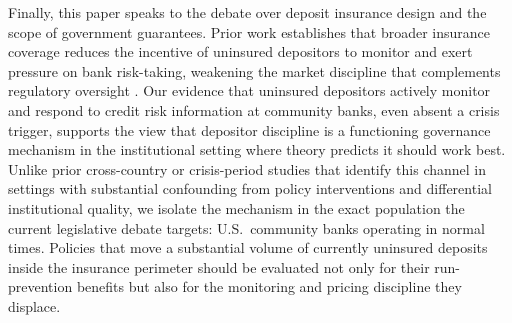 Finally, this paper speaks to the debate over deposit insurance design and the
scope of government guarantees.  Prior work establishes that broader insurance
coverage reduces the incentive of uninsured depositors to monitor and exert
pressure on bank risk-taking, weakening the market discipline that complements
regulatory oversight \citep{demirgucc2004market, flannery2019market}.  Our
evidence that uninsured depositors actively monitor and respond to credit risk
information at community banks, even absent a crisis trigger, supports the view
that depositor discipline is a functioning governance mechanism in the
institutional setting where theory predicts it should work best.  Unlike prior
cross-country or crisis-period studies that identify this channel in settings
with substantial confounding from policy interventions and differential
institutional quality, we isolate the mechanism in the exact population the
current legislative debate targets: U.S.\ community banks operating in normal
times.  Policies that move a substantial volume of currently uninsured deposits
inside the insurance perimeter should be evaluated not only for their
run-prevention benefits but also for the monitoring and pricing discipline they
displace.
